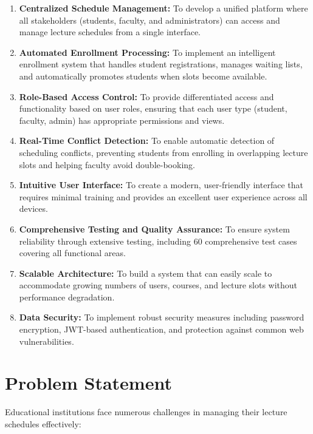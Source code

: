 \begin{enumerate}[leftmargin=*]
    \item \textbf{Centralized Schedule Management:} To develop a unified platform where all stakeholders (students, faculty, and administrators) can access and manage lecture schedules from a single interface.
    
    \item \textbf{Automated Enrollment Processing:} To implement an intelligent enrollment system that handles student registrations, manages waiting lists, and automatically promotes students when slots become available.
    
    \item \textbf{Role-Based Access Control:} To provide differentiated access and functionality based on user roles, ensuring that each user type (student, faculty, admin) has appropriate permissions and views.
    
    \item \textbf{Real-Time Conflict Detection:} To enable automatic detection of scheduling conflicts, preventing students from enrolling in overlapping lecture slots and helping faculty avoid double-booking.
    
    \item \textbf{Intuitive User Interface:} To create a modern, user-friendly interface that requires minimal training and provides an excellent user experience across all devices.
    
    \item \textbf{Comprehensive Testing and Quality Assurance:} To ensure system reliability through extensive testing, including 60 comprehensive test cases covering all functional areas.
    
    \item \textbf{Scalable Architecture:} To build a system that can easily scale to accommodate growing numbers of users, courses, and lecture slots without performance degradation.
    
    \item \textbf{Data Security:} To implement robust security measures including password encryption, JWT-based authentication, and protection against common web vulnerabilities.
\end{enumerate}

\section{Problem Statement}
Educational institutions face numerous challenges in managing their lecture schedules effectively:

